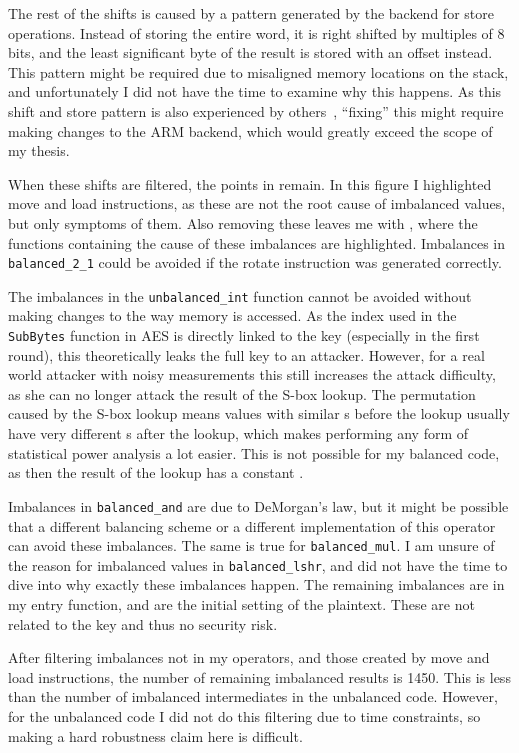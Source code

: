 The rest of the shifts is caused by a pattern generated by the backend for store operations.
Instead of storing the entire word, it is right shifted by multiples of 8 bits, and the least significant byte of the result is stored with an offset instead.
This pattern might be required due to misaligned memory locations on the stack, and unfortunately I did not have the time to examine why this happens.
As this shift and store pattern is also experienced by others~\cite{simon2018you}, ``fixing'' this might require making changes to the \llvm{} ARM backend, which would greatly exceed the scope of my thesis.

When these shifts are filtered, the points in  remain.
In this figure I highlighted move and load instructions, as these are not the root cause of imbalanced values, but only symptoms of them.
Also removing these leaves me with , where the functions containing the cause of these imbalances are highlighted.
Imbalances in \texttt{balanced\_2\_1} could be avoided if the rotate instruction was generated correctly.

The imbalances in the \texttt{unbalanced\_int} function cannot be avoided without making changes to the way memory is accessed.
As the index used in the \texttt{SubBytes} function in AES is directly linked to the key (especially in the first round), this theoretically leaks the full key to an attacker.
However, for a real world attacker with noisy measurements this still increases the attack difficulty, as she can no longer attack the result of the S-box lookup.
The permutation caused by the S-box lookup means values with similar \hammingw{}s before the lookup usually have very different \hammingw{}s after the lookup, which makes performing any form of statistical power analysis a lot easier.
This is not possible for my balanced code, as then the result of the lookup has a constant \hammingw{}.

Imbalances in \texttt{balanced\_and} are due to DeMorgan's law, but it might be possible that a different balancing scheme or a different implementation of this operator can avoid these imbalances.
The same is true for \texttt{balanced\_mul}.
I am unsure of the reason for imbalanced values in \texttt{balanced\_lshr}, and did not have the time to dive into why exactly these imbalances happen.
The remaining imbalances are in my entry function, and are the initial setting of the plaintext.
These are not related to the key and thus no security risk.

After filtering imbalances not in my operators, and those created by move and load instructions, the number of remaining imbalanced results is 1450.
This is less than the number of imbalanced intermediates in the unbalanced code.
However, for the unbalanced code I did not do this filtering due to time constraints, so making a hard robustness claim here is difficult.

